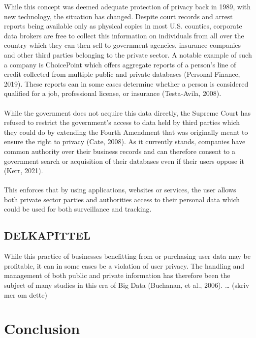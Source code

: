 \documentclass[11pt]{article}
\begin{document}
While this concept was deemed adequate protection of privacy back in 1989, with new technology, the situation has changed. Despite court records and arrest reports being available only as physical copies in most U.S. counties, corporate data brokers are free to collect this information on individuals from all over the country which they can then sell to government agencies, insurance companies and other third parties belonging to the private sector. A notable example of such a company is ChoicePoint which offers aggregate reports of a person’s line of credit collected from multiple public and private databases (Personal Finance, 2019). These reports can in some cases determine whether a person is considered qualified for a job, professional license, or insurance (Testa-Avila, 2008). \\ \\

While the government does not acquire this data directly, the Supreme Court has refused to restrict the government’s access to data held by third parties which they could do by extending the Fourth Amendment that was originally meant to ensure the right to privacy (Cate, 2008). As it currently stands, companies have common authority over their business records and can therefore consent to a government search or acquisition of their databases even if their users oppose it (Kerr, 2021). \\ \\

This enforces that by using applications, websites or services, the user allows both private sector parties and authorities access to their personal data which could be used for both surveillance and tracking. 

\subsection{DELKAPITTEL}
While this practice of businesses benefitting from or purchasing user data may be profitable, it can in some cases be a violation of user privacy. The handling and management of both public and private information has therefore been the subject of many studies in this era of Big Data (Buchanan, et al., 2006).  … (skriv mer om dette) 

\section{Conclusion}

\end{document}
